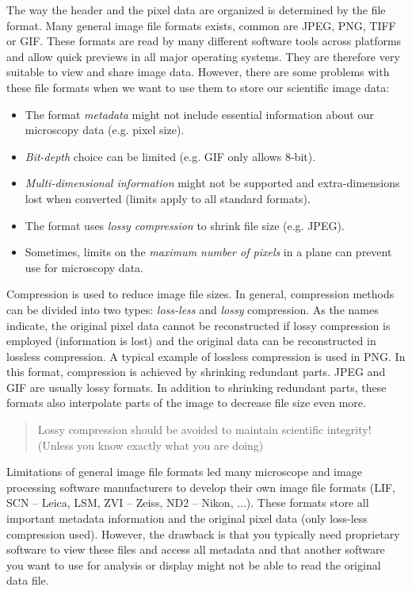 The way the header and the pixel data are organized is determined by the file format. Many general image file formats exists, common are JPEG, PNG, TIFF or GIF. These formats are read by many different software tools across platforms and allow quick previews in all major operating systems. They are therefore very suitable to view and share image data. However, there are some problems with these file formats when we want to use them to store our scientific image data:
\begin{itemize}
	\item The format \emph{metadata} might not include essential information about our microscopy data (e.g. pixel size).
	\item \emph{Bit-depth} choice can be limited (e.g. GIF only allows 8-bit).
	\item \emph{Multi-dimensional information} might not be supported and extra-dimensions lost when converted (limits apply to all standard formats).
	\item The format uses \emph{lossy compression} to shrink file size (e.g. JPEG).
	\item Sometimes, limits on the \emph{maximum number of pixels} in a plane can prevent use for microscopy data.
\end{itemize}

Compression is used to reduce image file sizes. In general, compression methods can be divided into two types: \emph{loss-less} and \emph{lossy} compression. As the names indicate, the original pixel data cannot be reconstructed if lossy compression is employed (information is lost) and the original data can be reconstructed in lossless compression. A typical example of lossless compression is used in PNG. In this format, compression is achieved by shrinking redundant parts. JPEG and GIF are usually lossy formats. In addition to shrinking redundant parts, these formats also interpolate parts of the image to decrease file size even more.  

\begin{quotation}
	Lossy compression should be avoided to maintain scientific integrity!\\(Unless you know exactly what you are doing)
\end{quotation}

Limitations of general image file formats led many microscope and image processing software manufacturers to develop their own image file formats (LIF, SCN -- Leica, LSM, ZVI -- Zeiss, ND2 -- Nikon, ...). These formats store all important metadata information and the original pixel data (only loss-less compression used). However, the drawback is that you typically need proprietary software to view these files and access all metadata and that another software you want to use for analysis or display might not be able to read the original data file.


